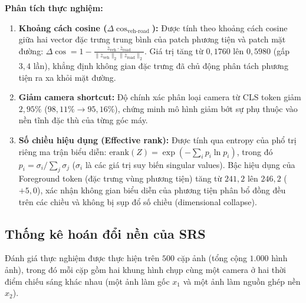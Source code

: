 \documentclass[11pt,a4paper]{article}
\begin{document}
\noindent
\textbf{Phân tích thực nghiệm:}
\begin{enumerate}[noitemsep, topsep=1pt]
    \item \textbf{Khoảng cách cosine ($\Delta\cos_{\text{veh-road}}$):} Được tính theo khoảng cách cosine giữa hai vector đặc trưng trung bình của patch phương tiện và patch mặt đường: $\Delta\cos = 1 - \frac{\bar{z}_{\text{veh}} \cdot \bar{z}_{\text{road}}}{\|\bar{z}_{\text{veh}}\|_2 \|\bar{z}_{\text{road}}\|_2}$. Giá trị tăng từ $0{,}1760$ lên $0{,}5980$ (gấp $3{,}4$ lần), khẳng định không gian đặc trưng đã chủ động phân tách phương tiện ra xa khỏi mặt đường.
    \item \textbf{Giảm camera shortcut:} Độ chính xác phân loại camera từ CLS token giảm $2{,}95\%$ ($98{,}11\% \to 95{,}16\%$), chứng minh mô hình giảm bớt sự phụ thuộc vào nền tĩnh đặc thù của từng góc máy.
    \item \textbf{Số chiều hiệu dụng (Effective rank):} Được tính qua entropy của phổ trị riêng ma trận biểu diễn: $\text{erank}(Z) = \exp\left(-\sum_{i} p_i \ln p_i\right)$, trong đó $p_i = \sigma_i / \sum_j \sigma_j$ ($\sigma_i$ là các giá trị suy biến singular values). Bậc hiệu dụng của Foreground token (đặc trưng vùng phương tiện) tăng từ $241{,}2$ lên $246{,}2$ ($+5{,}0$), xác nhận không gian biểu diễn của phương tiện phân bổ đồng đều trên các chiều và không bị sụp đổ số chiều (dimensional collapse).
\end{enumerate}

\clearpage
\subsection{Thống kê hoán đổi nền của SRS}
Đánh giá thực nghiệm được thực hiện trên $500$ cặp ảnh (tổng cộng $1.000$ hình ảnh), trong đó mỗi cặp gồm hai khung hình chụp cùng một camera ở hai thời điểm chiếu sáng khác nhau (một ảnh làm gốc $x_1$ và một ảnh làm nguồn ghép nền $x_2$).
\end{document}
